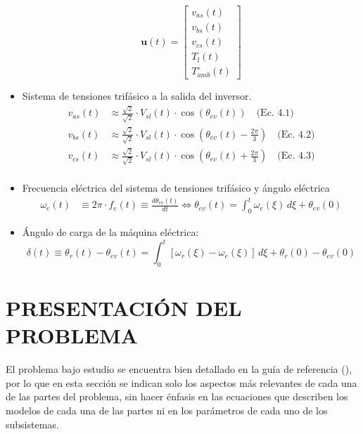 \documentclass[a4paper, 10pt, onecolumn,journal]{ieeeconf}
\begin{document}
\begin{itemize}
\begin{equation}
        \mathbf{u}(t) = \begin{bmatrix} v_{as}(t) \\ v_{bs}(t) \\ v_{cs}(t)\\ T_l(t) \\ T_{amb}^{\circ}(t) \end{bmatrix}
        \label{vector de entradas}
    \end{equation}
    \item Sistema de tensiones trifásico a la salida del inversor.
    \begin{align}
        v_{as}(t) &\approx \frac{\sqrt{2}}{\sqrt{2}} \cdot V_{sl}(t) \cdot \cos(\theta_{ev}(t)) \quad \text{(Ec. 4.1)} \\
        v_{bs}(t) &\approx \frac{\sqrt{2}}{\sqrt{2}} \cdot V_{sl}(t) \cdot \cos\left(\theta_{ev}(t) - \frac{2\pi}{3}\right) \quad \text{(Ec. 4.2)} \\
        v_{cs}(t) &\approx \frac{\sqrt{2}}{\sqrt{2}} \cdot V_{sl}(t)\cdot \cos\left(\theta_{ev}(t) + \frac{2\pi}{3}\right) \quad \text{(Ec. 4.3)} \\
        \label{sistema de tensiones trifásico real}
    \end{align}
    \item Frecuencia eléctrica del sistema de tensiones trifásico y ángulo eléctrica
    \begin{align}
        \omega_e(t) &\equiv 2\pi \cdot f_e(t) \equiv \frac{d\theta_{ev}(t)}{dt} \iff \theta_{ev}(t) = \int_{0}^{t} \omega_e(\xi) \, d\xi + \theta_{ev}(0)
        \label{frecuencia eléctrica y ángulo eléctrico}
    \end{align}
    \item Ángulo de carga de la máquina eléctrica:
    \begin{equation}
        \delta(t) \equiv \theta_r(t) - \theta_{ev}(t) = \int_{0}^{t} [\omega_r(\xi) - \omega_e(\xi)] \, d\xi + \theta_r(0) - \theta_{ev}(0)
        \label{ángulo de carga}
    \end{equation}
\end{itemize}

\section{PRESENTACIÓN DEL PROBLEMA}
El problema bajo estudio se encuentra bien detallado en la guía de referencia (\cite{c1}), por lo que en esta sección se indican solo los aspectos más relevantes de cada una de las partes del problema, sin hacer énfasis en las ecuaciones que describen los modelos de cada una de las partes ni en los parámetros de cada uno de los subsistemas.
\end{document}
